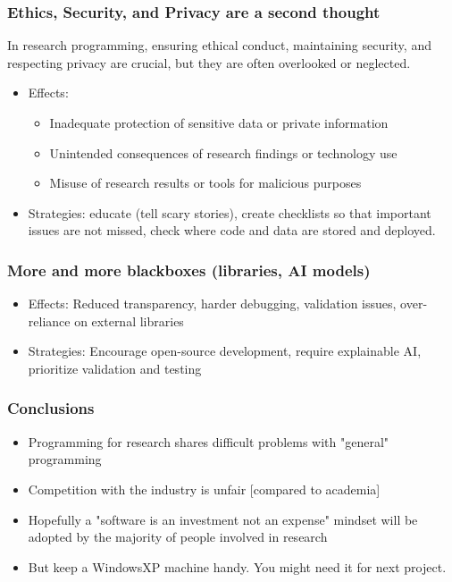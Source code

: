 \documentclass[14pt, aspectratio=169]{beamer}
\begin{document}
\begin{frame}
\frametitle{Ethics, Security, and Privacy are a second thought}
In research programming, ensuring ethical conduct, maintaining security, and respecting privacy are crucial, but they are often overlooked or neglected.
\begin{itemize}
\item Effects:
\begin{itemize}
    \item Inadequate protection of sensitive data or private information
    \item Unintended consequences of research findings or technology use
    \item Misuse of research results or tools for malicious purposes
\end{itemize}
\item Strategies: educate (tell scary stories), create checklists so that important issues are not missed, check where code and data are stored and deployed.
\end{itemize}
\end{frame}

\begin{frame}
\frametitle{More and more blackboxes (libraries, AI models)}
\begin{itemize}
\item Effects: Reduced transparency, harder debugging, validation issues, over-reliance on external libraries
\item Strategies: Encourage open-source development, require explainable AI, prioritize validation and testing
\end{itemize}
\end{frame}

\begin{frame}
\frametitle{Conclusions}
\begin{itemize}
\item Programming for research shares difficult problems with "general" programming 
\item Competition with the industry is unfair [compared to academia]
\item Hopefully a "software is an investment not an expense" mindset will be adopted by the majority of people involved in research
\item But keep a WindowsXP machine handy. You might need it for next project.
\end{itemize}
\end{frame}
\end{document}
